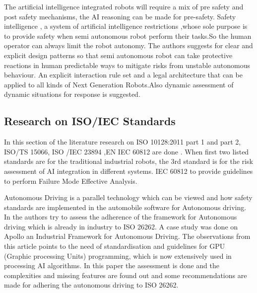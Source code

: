 { The artificial intelligence integrated robots will require a mix of pre safety and post safety mechanisms, the AI reasoning can be made for pre-safety. Safety intelligence , a system of artificial intelligence restrictions ,whose sole purpose is to provide safety when semi autonomous robot perform their tasks.So the human operator can always limit the robot autonomy. The authors suggests for clear and explicit design patterns so that semi autonomous robot can take protective reactions in human predictable ways to mitigate risks from unstable autonomous behaviour. An explicit interaction rule set and a legal architecture that can be applied to all kinds of Next Generation Robots.Also dynamic assessment of dynamic situations for response is suggested.
 
 \subsection{\RaggedRight Research on ISO/IEC Standards}{\normalfont\fontsize{14}{16}\bfseries} %

 In this section of the literature research on ISO 10128:2011 part 1 and part 2, ISO/TS 15066, ISO /IEC 23894 ,EN IEC 60812 are done . When first two listed standards are for the traditional industrial robots, the 3rd standard is for the risk assessment of AI integration in different systems. IEC 60812 to provide guidelines to perform Failure Mode Effective Analysis.

 Autonomous Driving is a parallel technology which can be viewed and how safety standards are implemented in the automobile software for Autonomous driving. In \cite{author9} the authors try to assess the adherence of the framework for Autonomous driving which is already in industry to ISO 26262. A case study was done on Apollo an Industrial Framework for Autonomous Driving. The observations from this article points to the need of standardisation and guidelines for GPU (Graphic processing Units) programming, which is now extensively used in processing AI algorithms.  In this paper the assessment is done and the complexities and missing features are found out and some recommendations are made for adhering the autonomous driving to ISO 26262.

}
